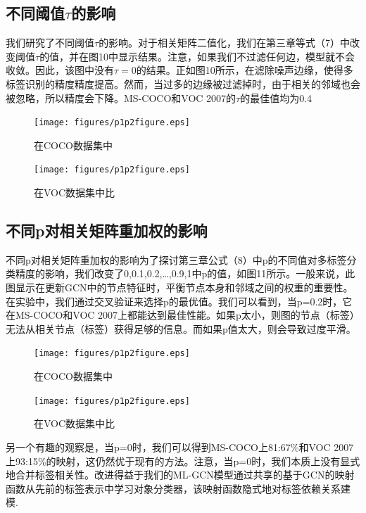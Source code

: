 \subsection{不同阈值$\tau$的影响}

我们研究了不同阈值$\tau$的影响。对于相关矩阵二值化，我们在第三章等式（7）中改变阈值$\tau$的值，并在图10中显示结果。注意，如果我们不过滤任何边，模型就不会收敛。因此，该图中没有$\tau=0$的结果。正如图10所示，在滤除噪声边缘，使得多标签识别的精度精度提高。然而，当过多的边缘被过滤掉时，由于相关的邻域也会被忽略，所以精度会下降。MS-COCO和VOC 2007的$\tau$的最佳值均为0.4

\begin{figure}[htbp!]
	\centering
	\texttt{[image: figures/p1p2figure.eps]}
	\caption{在COCO数据集中 }\label{fig:simuP1P2Result}
	\vspace{-1em}
\end{figure}

\begin{figure}[htbp!]
	\centering
	\texttt{[image: figures/p1p2figure.eps]}
	\caption{在VOC数据集中比}\label{fig:simuP1P2Result}
	\vspace{-1em}
\end{figure}

\subsection{不同p对相关矩阵重加权的影响}
不同p对相关矩阵重加权的影响为了探讨第三章公式（8）中p的不同值对多标签分类精度的影响，我们改变了{0,0.1,0.2,…,0.9,1}中p的值，如图11所示。一般来说，此图显示在更新GCN中的节点特征时，平衡节点本身和邻域之间的权重的重要性。在实验中，我们通过交叉验证来选择p的最优值。我们可以看到，当p=0.2时，它在MS-COCO和VOC 2007上都能达到最佳性能。如果p太小，则图的节点（标签）无法从相关节点（标签）获得足够的信息。而如果p值太大，则会导致过度平滑。

\begin{figure}[htbp!]
	\centering
	\texttt{[image: figures/p1p2figure.eps]}
	\caption{在COCO数据集中 }\label{fig:simuP1P2Result}
	\vspace{-1em}
\end{figure}

\begin{figure}[htbp!]
	\centering
	\texttt{[image: figures/p1p2figure.eps]}
	\caption{在VOC数据集中比}\label{fig:simuP1P2Result}
	\vspace{-1em}
\end{figure}

另一个有趣的观察是，当p=0时，我们可以得到MS-COCO上81:67\%和VOC 2007上93:15\%的映射，这仍然优于现有的方法。注意，当p=0时，我们本质上没有显式地合并标签相关性。改进得益于我们的ML-GCN模型通过共享的基于GCN的映射函数从先前的标签表示中学习对象分类器，该映射函数隐式地对标签依赖关系建模.

